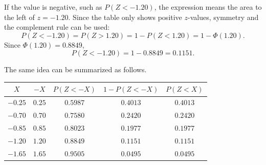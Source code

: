 	If the value is negative, such as $	P(Z<-1.20)$, the expression means the area to the left of \(z=-1.20\). Since the table only shows positive \(z\)-values, symmetry and the complement rule can be used:
	\[
	P(Z<-1.20)=P(Z>1.20)=1-P(Z<1.20)=1-\Phi(1.20).
	\]
	Since \(\Phi(1.20)=0.8849\),
	\[
	P(Z<-1.20)=1-0.8849=0.1151.
	\]
	
	The same idea can be summarized as follows.
	
	\begin{center}
		\begin{tabular}{c c c c c}
			\toprule
			\(X\) & \(-X\) & \(P(Z<-X)\) & \(1-P(Z<-X)\) & \(P(Z<X)\) \\
			\midrule
			\(-0.25\) & \(0.25\) & \(0.5987\) & \(0.4013\) & \(0.4013\) \\
			\(-0.70\) & \(0.70\) & \(0.7580\) & \(0.2420\) & \(0.2420\) \\
			\(-0.85\) & \(0.85\) & \(0.8023\) & \(0.1977\) & \(0.1977\) \\
			\(-1.20\) & \(1.20\) & \(0.8849\) & \(0.1151\) & \(0.1151\) \\
			\(-1.65\) & \(1.65\) & \(0.9505\) & \(0.0495\) & \(0.0495\) \\
			\bottomrule
		\end{tabular}
	\end{center}
	
